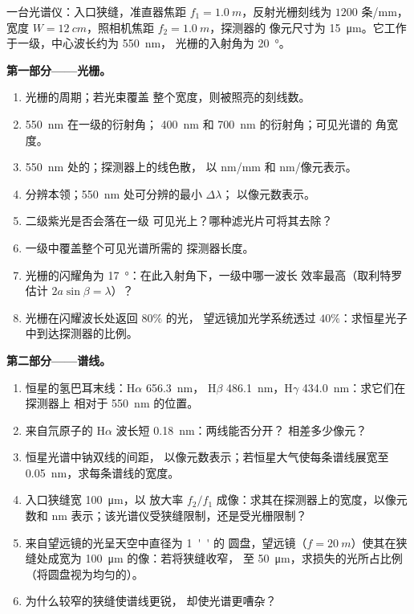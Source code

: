 \begin{problem}
\label{pb:b2:gratings:1}

一台光谱仪：入口狭缝，准直器焦距 $f_1 =
\qty{1.0}{m}$，反射光栅刻线为 $1200$ 条/mm，宽度 $W =
\qty{12}{cm}$，照相机焦距 $f_2 = \qty{1.0}{m}$，探测器的
像元尺寸为 \qty{15}{\micro m}。它工作于一级，中心波长约为 \qty{550}{nm}，
光栅的入射角为 \qty{20}{\degree}。

\medskip
\noindent\textbf{第一部分——光栅。}
\begin{enumerate}
  \item 光栅的周期；若光束覆盖
        整个宽度，则被照亮的刻线数。
  \item \qty{550}{nm} 在一级的衍射角；
        \qty{400}{nm} 和 \qty{700}{nm} 的衍射角；可见光谱的
        角宽度。
  \item \qty{550}{nm} 处的；探测器上的线色散，
        以 nm/mm 和 nm/像元表示。
  \item 分辨本领；\qty{550}{nm} 处可分辨的最小 $\Delta\lambda$；
        以像元数表示。
  \item 二级紫光是否会落在一级
        可见光上？哪种滤光片可将其去除？
  \item 一级中覆盖整个可见光谱所需的
        探测器长度。
  \item 光栅的闪耀角为 \qty{17}{\degree}：在此入射角下，一级中哪一波长
        效率最高（取利特罗估计
        $2a\sin\beta = \lambda$）？
  \item 光栅在闪耀波长处返回 $80\%$ 的光，
        望远镜加光学系统透过 $40\%$：求恒星光子
        中到达探测器的比例。
\end{enumerate}

\medskip
\noindent\textbf{第二部分——谱线。}
\begin{enumerate}[resume]
  \item 恒星的氢巴耳末线：H$\alpha$ \qty{656.3}{nm}，
        H$\beta$ \qty{486.1}{nm}，H$\gamma$ \qty{434.0}{nm}：求它们在探测器上
        相对于 \qty{550}{nm} 的位置。
  \item 来自氘原子的 H$\alpha$ 波长短 \qty{0.18}{nm}：两线能否分开？
        相差多少像元？
  \item 恒星光谱中钠双线的间距，
        以像元数表示；若恒星大气使每条谱线展宽至
        \qty{0.05}{nm}，求每条谱线的宽度。
  \item 入口狭缝宽 \qty{100}{\micro m}，以
        放大率 $f_2/f_1$ 成像：求其在探测器上的宽度，以像元数和
        nm 表示；该光谱仪受狭缝限制，还是受光栅限制？
  \item 来自望远镜的光呈天空中直径为 \qty{1}{''} 的
        圆盘，望远镜（$f = \qty{20}{m}$）使其在狭缝处成宽为 \qty{100}{\micro m}
        的像：若将狭缝收窄，
        至 \qty{50}{\micro m}，求损失的光所占比例（将圆盘视为均匀的）。
  \item 为什么较窄的狭缝使谱线更锐，
        却使光谱更嘈杂？
\end{enumerate}


\end{problem}
